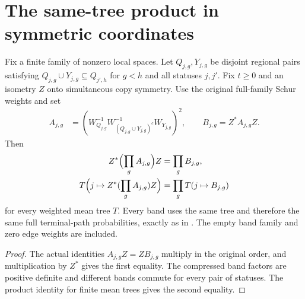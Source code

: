 \section{The same-tree product in symmetric coordinates}
\label{sec:replica_symmetric_mean_tree_product}

\begin{theorem}
\label{thm:replica_symmetric_common_tree_product}
\leanok
Fix a finite family of nonzero local spaces. Let $Q_{j,g},Y_{j,g}$
be disjoint regional pairs satisfying
$Q_{j,g}\cup Y_{j,g}\subseteq Q_{j',h}$ for $g<h$ and all statuses
$j,j'$. Fix $t\ge0$ and an isometry $Z$ onto simultaneous copy symmetry.
Use the original full-family Schur weights and set
\begin{align}
 A_{j,g}&=(W_{Q_{j,g}}^{-1}W_{(Q_{j,g}\cup Y_{j,g})^c}^{-1}
 W_{Y_{j,g}})^2,\qquad B_{j,g}=Z^*A_{j,g}Z.
\end{align}
Then
\begin{align}
 Z^*\Bigl(\prod_gA_{j,g}\Bigr)Z&=\prod_gB_{j,g},\\
 T\Bigl(j\mapsto Z^*(\prod_gA_{j,g})Z\Bigr)
   &=\prod_gT(j\mapsto B_{j,g})
\end{align}
for every weighted mean tree $T$. Every band uses the same tree and
therefore the same full terminal-path probabilities, exactly as in
\cite[Section~8, lines~114--121]{OpenAI2026AreaLaw}.
The empty band family and zero edge weights are included.
\end{theorem}
\begin{proof}
\leanok
{}
The actual identities $A_{j,g}Z=ZB_{j,g}$ multiply in the original
order, and multiplication by $Z^*$ gives the first equality.
The compressed band factors are positive definite and different bands
commute for every pair of statuses. The product identity for finite
mean trees gives the second equality.
\end{proof}
